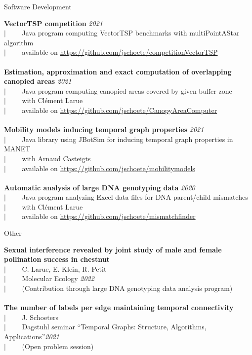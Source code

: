 \documentclass[french]{resume} %
\begin{document}
	\begin{rSection}{Software Development 
		}
		
		{\bf VectorTSP competition} \hfill {\em 2021}\\
		$| \qquad$ Java program computing VectorTSP benchmarks with multiPointAStar algorithm\\
		$| \qquad$ available on \url{https://github.com/jschoete/competitionVectorTSP}\\
		\\	
		{\bf Estimation, approximation and exact computation of overlapping canopied areas} \hfill {\em 2021}\\
		$| \qquad$ Java program computing canopied areas covered by given buffer zone\\
		$| \qquad$ with Clément Larue\\
		$| \qquad$ available on \url{https://github.com/jschoete/CanopyAreaComputer}\\
		\\	
		{\bf Mobility models inducing temporal graph properties} \hfill {\em 2021}\\
		$| \qquad$ Java library using JBotSim for inducing temporal graph properties in MANET\\
		$| \qquad$ with Arnaud Casteigts\\
		$| \qquad$ available on \url{https://github.com/jschoete/mobilitymodels}\\
		\\
		{\bf Automatic analysis of large DNA genotyping data} \hfill {\em 2020}\\
		$| \qquad$ Java program analyzing Excel data files for DNA parent/child mismatches\\
		$| \qquad$ with Clément Larue\\
		$| \qquad$ available on \url{https://github.com/jschoete/mismatchfinder}
	\end{rSection}
	
	\begin{rSection}{Other
		}
		
		{\bf {\small Sexual interference revealed by joint study of male and female pollination success in chestnut}}\\
		$| \qquad$ C. Larue, E. Klein, R. Petit\\
		$| \qquad$ Molecular Ecology \hfill {\em 2022}\\
		$| \qquad$ (Contribution through large DNA genotyping data analysis program)
		\\
		\\
		{\bf The number of labels per edge maintaining temporal connectivity}\\
		$| \qquad$ J. Schoeters\\
		$| \qquad$ Dagstuhl seminar ``Temporal Graphs: Structure, Algorithms, Applications''\hfill {\em 2021}\\
		$| \qquad$ (Open problem session)
	\end{rSection}
	
\end{document}
